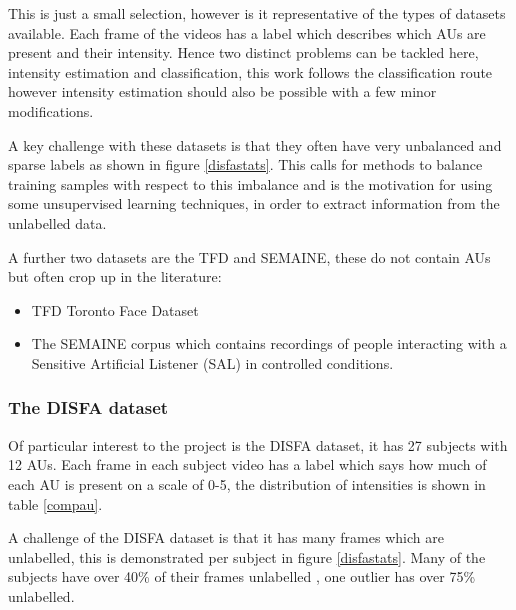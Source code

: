 \documentclass[9pt]{article} \usepackage{amsmath, amsthm, amssymb}
\begin{document}
This is just a small selection, however is it representative of the types of
datasets available. Each frame of the videos has a label which describes which AUs are
present and their intensity. Hence two distinct problems can be tackled here, intensity
estimation and classification, this work follows the classification route however
intensity estimation should also be possible with a few minor modifications.

A key challenge with these datasets is that they often have very unbalanced and
sparse labels as shown in figure \ref{disfastats}. This calls for methods
to balance training samples with respect to this imbalance and is the
motivation for using some unsupervised learning techniques, in order to extract information
from the unlabelled data.

A further two datasets are the TFD and SEMAINE, these do not contain AUs but often crop up in the
literature:
\begin{itemize}
     \item TFD \cite{tfd} Toronto Face Dataset
     \item The SEMAINE \cite{semaine} corpus which contains recordings
           of people interacting with a Sensitive Artificial Listener (SAL) in controlled conditions.
\end{itemize}

\subsubsection{The DISFA dataset} \label{disfa_list}
Of particular interest to the project is the DISFA dataset, it has 27 subjects with 12 AUs.
Each frame in each subject video has a label which says how much of each AU is present on
a scale of 0-5, the distribution of intensities is shown in table \ref{compau}.

A challenge of the DISFA dataset is that it has many frames which are unlabelled, this is demonstrated
per subject in figure \ref{disfastats}. Many of the subjects have over 40\% of their frames unlabelled
, one outlier has over 75\% unlabelled.
\end{document}
